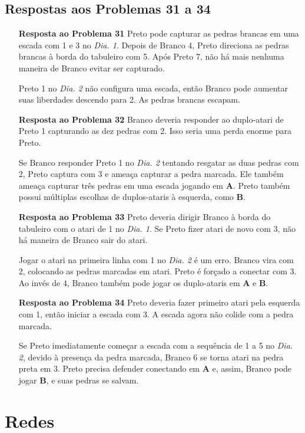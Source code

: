 \subsection{Respostas aos Problemas 31 a 34}

\begin{itemize}
    \item[\textbf{Resposta ao Problema 31}] Preto pode capturar as pedras brancas em uma escada com 1 e 3 no \emph{Dia. 1}. Depois de Branco 4, Preto direciona as pedras brancas à borda do tabuleiro com 5. Após Preto 7, não há mais nenhuma maneira de Branco evitar ser capturado.
    
        Preto 1 no \emph{Dia. 2} não configura uma escada, então Branco pode aumentar suas liberdades descendo para 2. As pedras brancas escapam.
    \item[\textbf{Resposta ao Problema 32}] Branco deveria responder ao duplo-atari de Preto 1 capturando as dez pedras com 2. Isso seria uma perda enorme para Preto.
     
        Se Branco responder Preto 1 no \emph{Dia. 2} tentando resgatar as duas pedras com 2, Preto captura com 3 e ameaça capturar a pedra marcada. Ele também ameaça capturar três pedras em uma escada jogando em \textbf{A}. Preto também possui múltiplas escolhas de duplos-ataris à esquerda, como \textbf{B}.
    \item[\textbf{Resposta ao Problema 33}] Preto deveria dirigir Branco à borda do tabuleiro com o atari de 1 no \emph{Dia. 1}. Se Preto fizer atari de novo com 3, não há maneira de Branco sair do atari.

        Jogar o atari na primeira linha com 1 no \emph{Dia. 2} é um erro. Branco vira com 2, colocando as pedras marcadas em atari. Preto é forçado a conectar com 3. Ao invés de 4, Branco também pode jogar os duplo-ataris em \textbf{A} e \textbf{B}.
    \item[\textbf{Resposta ao Problema 34}] Preto deveria fazer primeiro atari pela esquerda com 1, então iniciar a escada com 3. A escada agora não colide com a pedra marcada.
        
        Se Preto imediatamente começar a escada com a sequência de 1 a 5 no \emph{Dia. 2}, devido à presença da pedra marcada, Branco 6 se torna atari na pedra preta em 3. Preto precisa defender conectando em \textbf{A} e, assim, Branco pode jogar \textbf{B}, e suas pedras se salvam.
\end{itemize}

\section{Redes}

